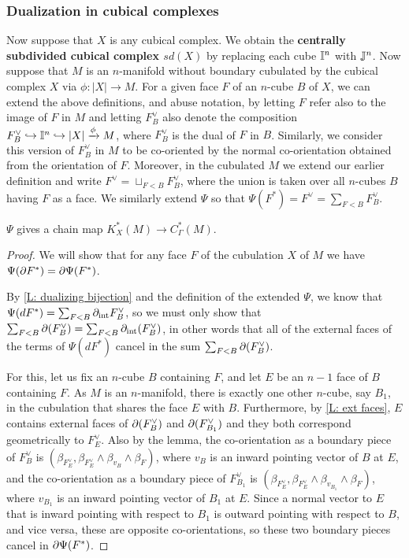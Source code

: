 \subsubsection{Dualization in cubical complexes}

Now suppose that $X$ is any cubical complex. We obtain the \textbf{centrally subdivided cubical complex $sd(X)$} by replacing each cube $\mathbb{I}^n$ with $\mathbb{J}^n$. 
Now suppose that $M$ is an $n$-manifold without boundary  cubulated by the cubical complex $X$ via $\phi:|X|\to M$. For a given face $F$ of an $n$-cube $B$ of $X$, we can extend the above definitions, and abuse notation, by letting $F$ refer also to the image of $F$ in $M$ and letting $F_B^\vee$ also denote the composition $F_B^\vee\hookrightarrow \mathbb{I}^n\hookrightarrow |X|\xrightarrow{\phi} M$, where $F_B^\vee$ is the dual of $F$ in $B$. Similarly, we consider this version of $F_B^\vee$ in $M$ to be co-oriented by the normal co-orientation obtained from the orientation of $F$. Moreover, in the cubulated $M$ we extend our earlier definition and write $F^\vee=\sqcup_{F<B} F^\vee_B$, where the union is taken over all $n$-cubes $B$ having $F$ as a face. 
We similarly extend $\Psi$ so that  $\Psi(F^*)=F^\vee=\sum_{F<B}  F_{B}^\vee$.

\begin{lemma}\label{L: dual chain map}
$\Psi$ gives a chain map $K_X^*(M)\to C_\Gamma^*(M)$.
\end{lemma}
\begin{proof}
We will show that for any face $F$ of the cubulation $X$ of $M$ we have $\Psi(\partial F^*)=\partial\Psi(F^*)$. 

By \cref{L: dualizing bijection} and the definition of the extended $\Psi$, we know that $\Psi(dF^*)=\sum_{F<B} \partial_{\text{int}}F^\vee_B$, so we must only show that $\sum_{F<B} \partial (F^\vee_B)=\sum_{F<B} \partial_{\text{int}}(F^\vee_B)$, in other words that all of the external faces of the terms of  $\Psi(dF^*)$ cancel in the sum  $\sum_{F<B} \partial (F^\vee_B)$. 

For this, let us fix an $n$-cube $B$ containing $F$, and let $E$ be an $n-1$ face of $B$ containing $F$. As $M$ is an $n$-manifold, there is exactly one other $n$-cube, say $B_1$, in the cubulation that shares the face $E$ with $B$. Furthermore, by \cref{L: ext faces}, $E$ contains external faces of $\partial(F^\vee_B)$ and $\partial(F^\vee_{B_1})$ and they both correspond geometrically to $F^\vee_E$. Also by the lemma, the co-orientation as a boundary piece of $F^\vee_B$ is $(\beta_{F_E^\vee},\beta_{F_E^\vee}\wedge\beta_{v_B}\wedge \beta_F)$, where $v_B$ is an inward pointing vector of $B$ at $E$, and  the co-orientation as a boundary piece of $F^\vee_{B_1}$ is $(\beta_{F_E^\vee},\beta_{F_E^\vee}\wedge\beta_{v_{B_1}}\wedge \beta_F)$, where $v_{B_1}$ is an inward pointing vector of $B_1$ at $E$. Since a normal vector to $E$ that is inward pointing with respect to $B_1$ is outward pointing with respect to $B$, and vice versa, these are opposite co-orientations, so these two boundary pieces cancel in $\partial \Psi(F^*)$. 
\end{proof}

